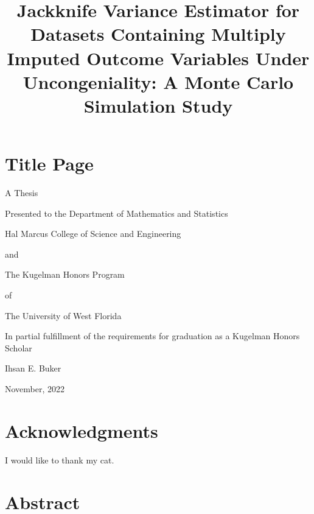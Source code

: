 \documentclass[
  letterpaper,
  DIV=11,
  numbers=noendperiod]{scrreprt}
\title{Jackknife Variance Estimator for Datasets Containing Multiply
Imputed Outcome Variables Under Uncongeniality: A Monte Carlo Simulation
Study}
\author{}
\date{}
\renewcommand*\contentsname{Table of contents}
\newcommand\contentsname{Table of contents}
\begin{document}
\maketitle
\ifdefined\Shaded\renewenvironment{Shaded}{\begin{tcolorbox}[borderline west={3pt}{0pt}{shadecolor}, breakable, frame hidden, sharp corners, enhanced, boxrule=0pt, interior hidden]}{\end{tcolorbox}}\fi

\renewcommand*\contentsname{Table of contents}
{
\hypersetup{linkcolor=}
\setcounter{tocdepth}{2}
\tableofcontents
}

\hypertarget{title-page}{%
\chapter*{\texorpdfstring{{Title Page}}{Title Page}}\label{title-page}}

A Thesis

Presented to the Department of Mathematics and Statistics

Hal Marcus College of Science and Engineering

and

The Kugelman Honors Program

of

The University of West Florida

In partial fulfillment of the requirements for graduation as a Kugelman
Honors Scholar

Ihsan E. Buker

November, 2022


\hypertarget{acknowledgments}{%
\chapter*{Acknowledgments}\label{acknowledgments}}

I would like to thank my cat.


\hypertarget{abstract}{%
\chapter{Abstract}\label{abstract}}
\end{document}
